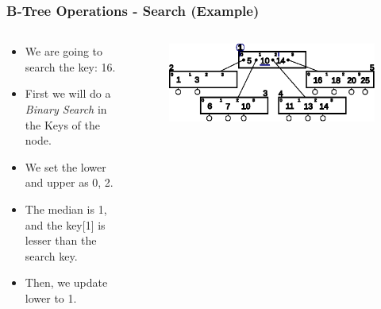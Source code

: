 \documentclass{beamer}
\begin{document}
\begin{frame}[t,allowframebreaks]
    \frametitle{B-Tree Operations - Search (Example)}
    \begin{columns}
        \begin{column}{.4\textwidth}
            \vspace{-1cm}
            \begin{block}{}
                \begin{itemize}
                    \item We are going to search the key: 16.
                    \item First we will do a \emph{Binary Search} in the Keys of the node.
                    \item We set the lower and upper as 0, 2.
                    \item The median is 1, and the key[1] is lesser than the search key.
                    \item Then, we update lower to 1.
                \end{itemize}
            \end{block}
        \end{column}
        \begin{column}{.6\textwidth}
            \vspace{-1cm}
            \begin{block}{}
                \begin{figure}[h!]
                    \includegraphics[width=\linewidth]{resources/made/btree_search_step1.eps}
                \end{figure}    
                \btreeSearchStepOne
            \end{block}
        \end{column}
    \end{columns}

    \framebreak


\end{frame}
\end{document}
